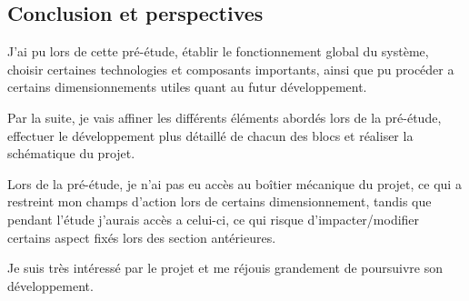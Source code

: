\newpage


\subsection{Conclusion et perspectives} \label{ssec:PreeConc}
{

J'ai pu lors de cette pré-étude, établir le fonctionnement global du système, choisir certaines technologies et composants importants, ainsi que pu procéder a certains dimensionnements utiles quant au futur développement.


Par la suite, je vais affiner les différents éléments abordés lors de la pré-étude, effectuer le développement plus détaillé de chacun des blocs et réaliser la schématique du projet.


Lors de la pré-étude, je n'ai pas eu accès au boîtier mécanique du projet, ce qui a restreint mon champs d'action lors de certains dimensionnement, tandis que pendant l'étude j'aurais accès a celui-ci, ce qui risque d'impacter/modifier certains aspect fixés lors des section antérieures.


Je suis très intéressé par le projet et me réjouis grandement de poursuivre son développement.

}

\clearpage
